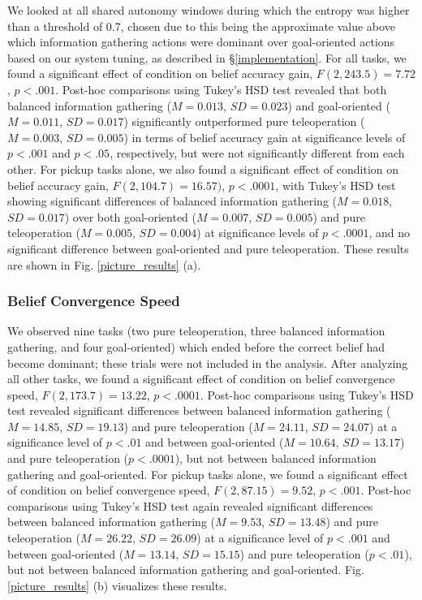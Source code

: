 \documentclass[conference]{IEEEtran}
\begin{document}
We looked at all shared autonomy windows during which the entropy was higher than a threshold of 0.7, chosen due to this being the approximate value above which information gathering actions were dominant over goal-oriented actions based on our system tuning, as described in \S\ref{implementation}. For all tasks, we found a significant effect of condition on belief accuracy gain, $F(2, 243.5) = 7.72$, $p < .001$. Post-hoc comparisons using Tukey's HSD test revealed that both balanced information gathering ($M = 0.013$, $SD = 0.023$) and goal-oriented ($M = 0.011$, $SD = 0.017$) significantly outperformed pure teleoperation ($M = 0.003$, $SD = 0.005$) in terms of belief accuracy gain at significance levels of $p < .001$ and $p < .05$, respectively, but were not significantly different from each other. For pickup tasks alone, we also found a significant effect of condition on belief accuracy gain, $F(2, 104.7) = 16.57)$, $p < .0001$, with Tukey's HSD test showing significant differences of balanced information gathering ($M = 0.018$, $SD = 0.017$) over both goal-oriented ($M = 0.007$, $SD = 0.005$) and pure teleoperation ($M = 0.005$, $SD = 0.004$) at significance levels of $p < .0001$,  and no significant difference between goal-oriented and pure teleoperation. These results are shown in Fig. \ref{picture_results} (a).

\subsubsection{Belief Convergence Speed}

We observed nine tasks (two pure teleoperation, three balanced information gathering, and four goal-oriented) which ended before the correct belief had become dominant; these trials were not included in the analysis. After analyzing all other tasks, we found a significant effect of condition on belief convergence speed, $F(2, 173.7) = 13.22$, $p < .0001$. Post-hoc comparisons using Tukey's HSD test revealed significant differences between balanced information gathering ($M = 14.85$, $SD = 19.13$) and pure teleoperation ($M = 24.11$, $SD = 24.07$) at a significance level of $p < .01$ and between goal-oriented ($M = 10.64$, $SD = 13.17$) and pure teleoperation ($p < .0001$), but not between balanced information gathering and goal-oriented. For pickup tasks alone, we found a significant effect of condition on belief convergence speed, $F(2, 87.15) = 9.52$, $p < .001$. Post-hoc comparisons using Tukey's HSD test again revealed significant differences between balanced information gathering ($M = 9.53$, $SD = 13.48$) and pure teleoperation ($M = 26.22$, $SD = 26.09$) at a significance level of $p < .001$ and between goal-oriented ($M = 13.14$, $SD = 15.15$) and pure teleoperation ($p < .01$), but not between balanced information gathering and goal-oriented. Fig. \ref{picture_results} (b) visualizes these results.
\end{document}
